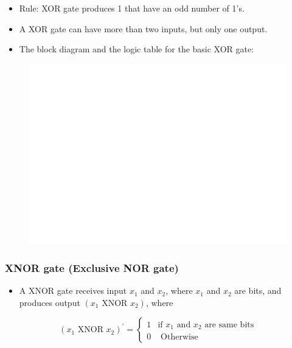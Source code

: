 \documentclass[]{book}
\providecommand{\tightlist}{%
  \setlength{\itemsep}{0pt}\setlength{\parskip}{0pt}}
\begin{document}
\begin{itemize}
\tightlist
\item
  Rule: XOR gate produces 1 that have an odd number of 1's.
\item
  A XOR gate can have more than two inputs, but only one output.
\item
  The block diagram and the logic table for the basic XOR gate:
\end{itemize}

\begin{figure}

{\centering \includegraphics[width=1\linewidth]{figure/boxC46-1} 

}

\end{figure}

\hypertarget{xnor-gate-exclusive-nor-gate}{%
\subsubsection{XNOR gate (Exclusive NOR gate)}\label{xnor-gate-exclusive-nor-gate}}

\begin{itemize}
\tightlist
\item
  A XNOR gate receives input \(x_1\) and \(x_2\), where \(x_1\) and \(x_2\) are bits, and produces output \((x_1\text{ XNOR }x_2)\), where
\end{itemize}

\begin{equation}
(x_1 \text{ XNOR } x_2)^\prime =
\begin{cases} 
1 & \text{if } x_1 \text{ and  } x_2 \text{ are same bits}\\
0 & \text{ Otherwise }
\end{cases}
\end{equation}
\end{document}
